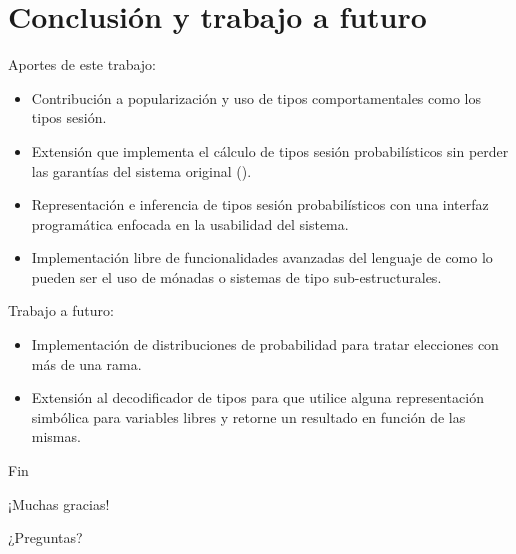 \section{Conclusión y trabajo a futuro}
\begin{frame}{\insertsection}
	Aportes de este trabajo:
	\begin{itemize}
		\item Contribución a popularización y uso de tipos comportamentales como los
			tipos sesión.
		\item Extensión que implementa el cálculo de tipos sesión
			probabilísticos sin perder las garantías del sistema
			original (\FuSe).
		\item Representación e inferencia de tipos sesión
			probabilísticos con una interfaz programática enfocada
			en la usabilidad del sistema.
		\item Implementación libre de funcionalidades avanzadas del
			lenguaje de como lo pueden ser el uso de mónadas o
			sistemas de tipo sub-estructurales.
	\end{itemize}
\end{frame}

\begin{frame}{\insertsection}
	Trabajo a futuro:
	\begin{itemize}
		\item Implementación de distribuciones de probabilidad para
			tratar elecciones con más de una rama.
		\item Extensión al decodificador de tipos para que utilice
			alguna representación simbólica para variables libres y
			retorne un resultado en función de las mismas.
	\end{itemize}
\end{frame}

\begin{frame}{Fin}
	\begin{center}
	\Huge ¡Muchas gracias!

	\bigskip

	\Huge ¿Preguntas?
	\end{center}
\end{frame}
